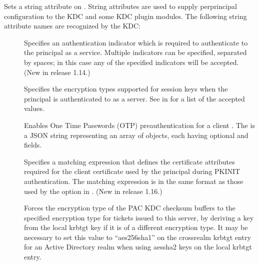 \documentclass[letterpaper,10pt,english]{sphinxmanual}
\begin{document}
\sphinxAtStartPar
Sets a string attribute on .  String attributes are used to
supply per\sphinxhyphen{}principal configuration to the KDC and some KDC plugin
modules.  The following string attribute names are recognized by the
KDC:
\begin{description}
\item[{}] \leavevmode
\sphinxAtStartPar
Specifies an authentication indicator which is required to
authenticate to the principal as a service.  Multiple indicators
can be specified, separated by spaces; in this case any of the
specified indicators will be accepted.  (New in release 1.14.)

\item[{}] \leavevmode
\sphinxAtStartPar
Specifies the encryption types supported for session keys when the
principal is authenticated to as a server.  See
{\hyperref[\detokenize{admin/conf_files/kdc_conf:encryption-types}]{}} in {\hyperref[\detokenize{admin/conf_files/kdc_conf:kdc-conf-5}]{}} for a list of the
accepted values.

\item[{}] \leavevmode
\sphinxAtStartPar
Enables One Time Passwords (OTP) preauthentication for a client
.  The  is a JSON string representing an array
of objects, each having optional  and  fields.

\item[{}] \leavevmode
\sphinxAtStartPar
Specifies a matching expression that defines the certificate
attributes required for the client certificate used by the
principal during PKINIT authentication.  The matching expression
is in the same format as those used by the 
option in {\hyperref[\detokenize{admin/conf_files/krb5_conf:krb5-conf-5}]{}}.  (New in release 1.16.)

\item[{}] \leavevmode
\sphinxAtStartPar
Forces the encryption type of the PAC KDC checksum buffers to the
specified encryption type for tickets issued to this server, by
deriving a key from the local krbtgt key if it is of a different
encryption type.  It may be necessary to set this value to
“aes256\sphinxhyphen{}sha1” on the cross\sphinxhyphen{}realm krbtgt entry for an Active
Directory realm when using aes\sphinxhyphen{}sha2 keys on the local krbtgt
entry.

\end{description}
\end{document}
